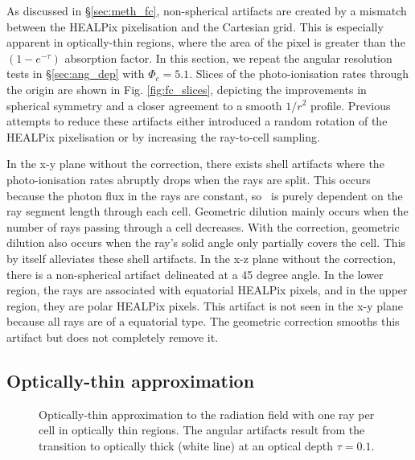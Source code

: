 \documentclass[useAMS,usenatbib]{mn2e}
\begin{document}
As discussed in \S\ref{sec:meth_fc}, non-spherical artifacts are
created by a mismatch between the HEALPix pixelisation and the
Cartesian grid.  This is especially apparent in optically-thin
regions, where the area of the pixel is greater than the
$(1-e^{-\tau})$ absorption factor.  In this section, we repeat the
angular resolution tests in \S\ref{sec:ang_dep} with $\Phi_c = 5.1$.
Slices of the photo-ionisation rates through the origin are shown in
Fig. \ref{fig:fc_slices}, depicting the improvements in spherical
symmetry and a closer agreement to a smooth $1/r^2$ profile.  Previous
attempts to reduce these artifacts either introduced a random rotation
of the HEALPix pixelisation \citep[e.g.][]{Abel02_RT, Trac07,
  Krumholz07_ART} or by increasing the ray-to-cell sampling.

In the x-y plane without the correction, there exists shell artifacts
where the photo-ionisation rates abruptly drops when the rays are
split.  This occurs because the photon flux in the rays are constant,
so \kph~is purely dependent on the ray segment length through each
cell.  Geometric dilution mainly occurs when the number of rays
passing through a cell decreases.  With the correction, geometric
dilution also occurs when the ray's solid angle only partially covers
the cell.  This by itself alleviates these shell artifacts.  In the
x-z plane without the correction, there is a non-spherical artifact
delineated at a 45 degree angle.  In the lower region, the rays are
associated with equatorial HEALPix pixels, and in the upper region,
they are polar HEALPix pixels.  This artifact is not seen in the x-y
plane because all rays are of a equatorial type.  The geometric
correction smooths this artifact but does not completely remove it.

\subsection{Optically-thin approximation}

\begin{figure}
  \caption{\label{fig:rayopt} Optically-thin approximation to the
    radiation field with one ray per cell in optically thin regions.
    The angular artifacts result from the transition to optically
    thick (white line) at an optical depth $\tau = 0.1$.}
\end{figure}
\end{document}
